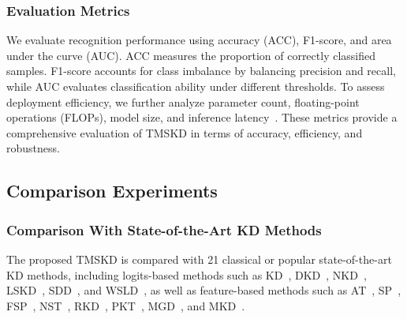 ﻿\documentclass[lettersize,journal]{IEEEtran}
\begin{document}
\subsubsection{Evaluation Metrics}
We evaluate recognition performance using accuracy (ACC), F1-score, and area under the curve (AUC). ACC measures the proportion of correctly classified samples. F1-score accounts for class imbalance by balancing precision and recall, while AUC evaluates classification ability under different thresholds. To assess deployment efficiency, we further analyze parameter count, floating-point operations (FLOPs), model size, and inference latency~\cite{Han2016DeepCompression}. These metrics provide a comprehensive evaluation of TMSKD in terms of accuracy, efficiency, and robustness.

\subsection{Comparison Experiments}
\subsubsection{Comparison With State-of-the-Art KD Methods}
The proposed TMSKD is compared with 21 classical or popular state-of-the-art KD methods, including logits-based methods such as KD~\cite{Hinton2015Distilling}, DKD~\cite{Zhao2022DKD}, NKD~\cite{Yang2023NKD}, LSKD~\cite{Sun2024LSKD}, SDD~\cite{Wei2024SDD}, and WSLD~\cite{Zhou2021WSLD}, as well as feature-based methods such as AT~\cite{Zagoruyko2017AT}, SP~\cite{Tung2019SP}, FSP~\cite{Yim2017FSP}, NST~\cite{Huang2017NST}, RKD~\cite{Park2019RKD}, PKT~\cite{Passalis2018PKT}, MGD~\cite{Yang2022MGD}, and MKD~\cite{Lao2023MKD}.
\end{document}
